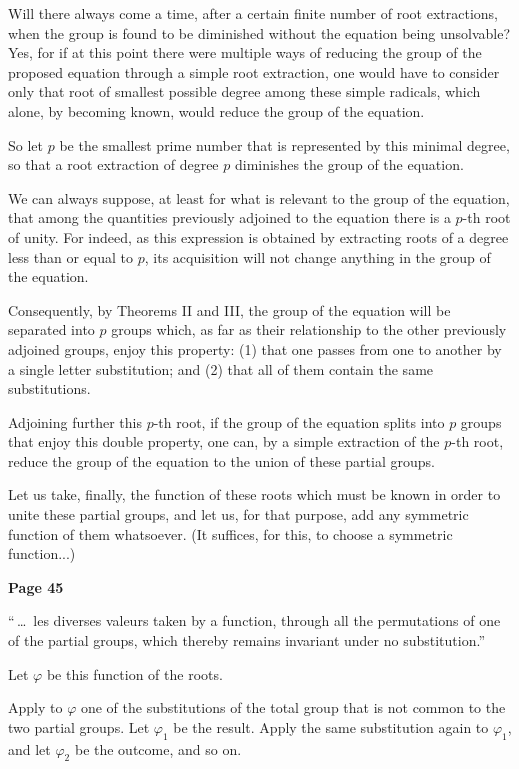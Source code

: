 \documentclass{article}
\begin{document}
Will there always come a time, after a certain finite number of root extractions, when the group is found to be diminished without the equation being unsolvable? Yes, for if at this point there were multiple ways of reducing the group of the proposed equation through a simple root extraction, one would have to consider only that root of smallest possible degree among these simple radicals, which alone, by becoming known, would reduce the group of the equation.

So let $p$ be the smallest prime number that is represented by this minimal degree, so that a root extraction of degree $p$ diminishes the group of the equation.

We can always suppose, at least for what is relevant to the group of the equation, that among the quantities previously adjoined to the equation there is a $p$-th root of unity. For indeed, as this expression is obtained by extracting roots of a degree less than or equal to $p$, its acquisition will not change anything in the group of the equation.

Consequently, by Theorems II and III, the group of the equation will be separated into $p$ groups which, as far as their relationship to the other previously adjoined groups, enjoy this property: (1) that one passes from one to another by a single letter substitution; and (2) that all of them contain the same substitutions.

Adjoining further this $p$-th root, if the group of the equation splits into $p$ groups that enjoy this double property, one can, by a simple extraction of the $p$-th root, reduce the group of the equation to the union of these partial groups.

Let us take, finally, the function of these roots which must be known in order to unite these partial groups, and let us, for that purpose, add any symmetric function of them whatsoever. (It suffices, for this, to choose a symmetric function...) 


\newpage

\centerline{\textbf{Page 45}}

\medskip


\noindent
“\,\dots\ les diverses valeurs taken by a function, through all the permutations of one of the partial groups, which thereby remains invariant under no substitution.”

\medskip
\noindent
Let $\varphi$ be this function of the roots.

\noindent
Apply to $\varphi$ one of the substitutions of the total group that is not common to the two partial groups. Let $\varphi_{1}$ be the result. Apply the same substitution again to $\varphi_{1}$, and let $\varphi_{2}$ be the outcome, and so on.
\end{document}
